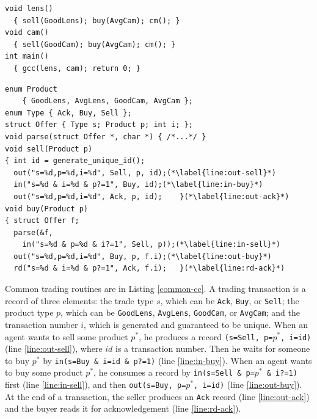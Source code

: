 \documentclass[preprint,10pt]{sigplanconf}
\newcommand{\monospace}[1]{\texttt{\small #1}}
\newcommand{\ry}[1]{\textcolor{red}{[RY: #1]}}
\begin{document}
\begin{lstlisting}[label=jill-cc,caption=\monospace{jill.cc}]
void lens()
  { sell(GoodLens); buy(AvgCam); cm(); }
void cam()
  { sell(GoodCam); buy(AvgCam); cm(); }
int main()
  { gcc(lens, cam); return 0; }
\end{lstlisting}

\begin{lstlisting}[label=common-cc,caption=Common routines for trading]
enum Product
    { GoodLens, AvgLens, GoodCam, AvgCam };
enum Type { Ack, Buy, Sell };
struct Offer { Type s; Product p; int i; };
void parse(struct Offer *, char *) { /*...*/ }
void sell(Product p)
{ int id = generate_unique_id();
  out("s=%d,p=%d,i=%d", Sell, p, id);(*\label{line:out-sell}*)
  in("s=%d & i=%d & p?=1", Buy, id);(*\label{line:in-buy}*)
  out("s=%d,p=%d,i=%d", Ack, p, id);    }(*\label{line:out-ack}*)
void buy(Product p)
{ struct Offer f;
  parse(&f,
    in("s=%d & p=%d & i?=1", Sell, p));(*\label{line:in-sell}*)
  out("s=%d,p=%d,i=%d", Buy, p, f.i);(*\label{line:out-buy}*)
  rd("s=%d & i=%d & p?=1", Ack, f.i);   }(*\label{line:rd-ack}*)
\end{lstlisting}

Common trading routines are in Listing \ref{common-cc}. 
A trading transaction is a record of three elements: 
the trade type $s$, which can be {\tt Ack}, {\tt Buy}, or {\tt Sell}; 
the product type $p$, which can be {\tt GoodLens}, {\tt AvgLens}, 
{\tt GoodCam}, or {\tt AvgCam}; and the transaction number $i$, 
which is generated and guaranteed to be unique. 
When an agent wants to sell some product $p^*$, 
he produces a record {\tt (s=Sell, p=$p^*$, i=id)} (line \ref{line:out-sell}), 
where $id$ is a transaction number. 
Then he waits for someone to buy $p^*$ by 
{\tt in(s=Buy \& i=id \& p?=1)} (line \ref{line:in-buy}). 
When an agent wants to buy some product $p^*$, 
he consumes a record by {\tt in(s=Sell \& p=$p^*$ \& i?=1)} 
first (line \ref{line:in-sell}), 
and then {\tt out(s=Buy, p=$p^*$, i=id)} (line \ref{line:out-buy}). 
At the end of a transaction, 
the seller produces an {\tt Ack} record (line \ref{line:out-ack}) and 
the buyer reads it for acknowledgement (line \ref{line:rd-ack}). 

\end{document}
